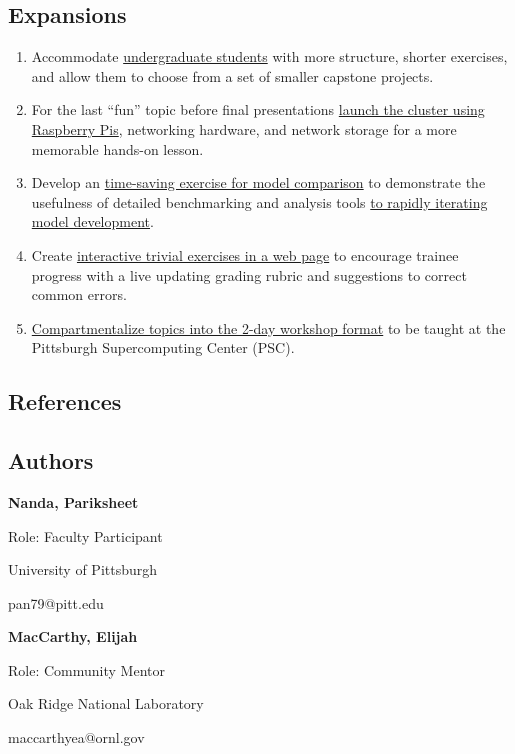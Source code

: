 \documentclass{article}
\newcommand{\sectionbox}[1]{%
  \begin{tcolorbox}[sharp corners,boxrule=0pt,colback=fh-blue,coltext=fh-gold]%
    \section*{#1\vphantom{Yy}}%
  \end{tcolorbox}%
}
\begin{document}
\begin{multicols}{2}
  \sectionbox{Expansions}%
  \begin{multicols}{2}
    \begin{enumerate}
    \item Accommodate \ul{undergraduate students} %
      with more structure, %
      shorter exercises, %
      and allow them to choose from a set of smaller capstone projects.
    \item For the last ``fun'' topic before final presentations %
      \ul{launch the cluster using Raspberry Pis}, %
      networking hardware, and network storage %
      for a more memorable hands-on lesson.
    \item Develop an \ul{time-saving exercise for model comparison} %
      to demonstrate the usefulness %
      of detailed benchmarking and analysis tools %
      \ul{to rapidly iterating model development}.
    \item Create \ul{interactive trivial exercises in a web page} %
      to encourage trainee progress with %
      a live updating grading rubric %
      and suggestions to correct common errors.
    \item \ul{Compartmentalize topics %
      into the 2-day workshop format} %
      to be taught at the Pittsburgh Supercomputing Center (PSC).
    \end{enumerate}
  \end{multicols}

  \sectionbox{References}
  {
    \setlength{\columnsep}{1.5pc}
    \begin{multicols}{2}
      \printbibliography[heading=none]{}
    \end{multicols}
  }

  \sectionbox{Authors}%
  {
    \setlength{\parindent}{5em}

    \textbf{\textcolor{fh-blue}{Nanda, Pariksheet}}

    Role: Faculty Participant

    University of Pittsburgh

    pan79@pitt.edu
    \vspace{\baselineskip}

    \textbf{\textcolor{fh-blue}{MacCarthy, Elijah}}

    Role: Community Mentor

    Oak Ridge National Laboratory

    maccarthyea@ornl.gov
  }

\end{multicols}
\end{document}
